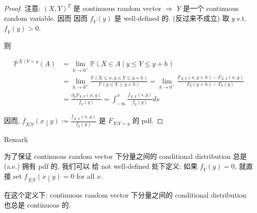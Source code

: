 \begin{proof}

注意: \((\mathit{X},\mathit{Y})^{\mathit{T}}\) 是 continuous random vector \(\Longrightarrow\) \(\mathit{Y}\) 是一个 continuous random variable. 因而 因而 \(\mathit{f}_{\mathit{Y}}(\mathit{y})\) 是 well-defined 的. (反过来不成立) 取 \(\mathit{y}\) s.t. \(\mathit{f}_{\mathit{Y}}(\mathit{y}) > 0\).

则

\[\begin{matrix}
{\mathbb{P}^{\mathit{X} \mid \mathit{Y} = \mathit{y}}(\mathit{A})} & {= \lim\limits_{h\rightarrow 0^{+}}\mathbb{P}(\mathit{X} \in \mathit{A} \mid \mathit{y} \leq \mathit{Y} \leq \mathit{y} + h)} \\
 & {= \lim\limits_{h\rightarrow 0^{+}}\frac{\mathbb{P}(\mathit{X} \leq \mathit{x},\mathit{y} \leq \mathit{Y} \leq \mathit{y} + h)}{\mathbb{P}(\mathit{y} \leq \mathit{Y} \leq \mathit{y} + h)} = \lim\limits_{h\rightarrow 0^{+}}\frac{\mathit{F}_{\mathit{X},\mathit{Y}}(\mathit{x},\mathit{y} + h) - \mathit{F}_{\mathit{X},\mathit{Y}}(\mathit{x},\mathit{y})}{\mathit{F}_{\mathit{Y}}(\mathit{y} + h) - \mathit{F}_{\mathit{Y}}(\mathit{y})}} \\
 & {= \frac{\mathit{\partial}_{\mathit{y}}\mathit{F}_{\mathit{X},\mathit{Y}}(\mathit{x},\mathit{y})}{\mathit{f}_{\mathit{Y}}(\mathit{y})} = \int_{- \infty}^{\mathit{x}}\frac{\mathit{f}_{\mathit{X},\mathit{Y}}(\mathit{s},\mathit{y})}{\mathit{f}_{\mathit{Y}}(\mathit{y})}\mathit{d}\mathit{s}}
\end{matrix}\]

因而, \(\left. \mathit{f}_{\mathit{X}|\mathit{Y}}(\mathit{x} \middle| \mathit{y}) := \frac{\mathit{f}_{\mathit{X},\mathit{Y}}(\mathit{x},\mathit{y})}{\mathit{f}_{\mathit{Y}}(\mathit{y})} \right.\) 是 \(\mathit{F}_{\mathit{X}|\mathit{Y} = \mathit{y}}\) 的 pdf.

\end{proof}

\begin{qlremark}{Remark}

为了保证 continuous random vector 下分量之间的 conditional distribution 总是 (a.e.) 拥有 pdf 的, 我们可以 给 not well-defined 处下定义: 如果 \(\mathit{f}_{\mathit{Y}}(\mathit{y}) = 0\), 就直接 set \(\left. \mathit{f}_{\mathit{X}|\mathit{Y}}(\mathit{x} \middle| \mathit{y}) = 0 \right.\) for all \(\mathit{x}\).

在这个定义下: continuous random vector 下分量之间的 conditional distribution 也总是 continuous 的.

\end{qlremark}

